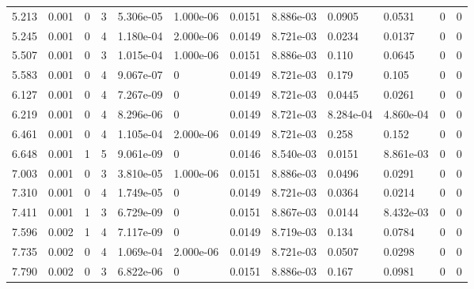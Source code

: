 \documentclass[preview]{standalone}
\begin{document}
{{\begin{tabular}{L{1.2cm}C{1.2cm} C{0.3cm}C{0.5cm} C{1.4cm}C{1.4cm} C{1.4cm}C{1.4cm} C{1.6cm}C{1.6cm} C{1.6cm}C{1.6cm}}
  5.213  &  0.001  & 0     &  3 &  5.306e-05  & 1.000e-06  &  0.0151&   8.886e-03& 0.0905 & 0.0531   &  0 & 0  \\ 
  5.245  &  0.001  & 0     &  4 &  1.180e-04  & 2.000e-06  &  0.0149&   8.721e-03& 0.0234 & 0.0137   &  0 & 0  \\ 
  5.507  &  0.001  & 0     &  3 &  1.015e-04  & 1.000e-06  &  0.0151&   8.886e-03& 0.110 & 0.0645   &  0 & 0  \\ 
  5.583  &  0.001  & 0     &  4 &  9.067e-07  & 0  &  0.0149&   8.721e-03& 0.179 & 0.105   &  0 & 0  \\ 
  6.127  &  0.001  & 0     &  4 &  7.267e-09  & 0  &  0.0149&   8.721e-03& 0.0445 & 0.0261   &  0 & 0  \\ 
  6.219  &  0.001  & 0     &  4 &  8.296e-06  & 0  &  0.0149&   8.721e-03& 8.284e-04 & 4.860e-04   &  0 & 0  \\ 
  6.461  &  0.001  & 0     &  4 &  1.105e-04  & 2.000e-06  &  0.0149&   8.721e-03& 0.258 & 0.152   &  0 & 0  \\ 
  6.648  &  0.001  & 1     &  5 &  9.061e-09  & 0  &  0.0146&   8.540e-03& 0.0151 & 8.861e-03   &  0 & 0  \\ 
  7.003  &  0.001  & 0     &  3 &  3.810e-05  & 1.000e-06  &  0.0151&   8.886e-03& 0.0496 & 0.0291   &  0 & 0  \\ 
  7.310  &  0.001  & 0     &  4 &  1.749e-05  & 0  &  0.0149&   8.721e-03& 0.0364 & 0.0214   &  0 & 0  \\ 
  7.411  &  0.001  & 1     &  3 &  6.729e-09  & 0  &  0.0151&   8.867e-03& 0.0144 & 8.432e-03   &  0 & 0  \\ 
  7.596  &  0.002  & 1     &  4 &  7.117e-09  & 0  &  0.0149&   8.719e-03& 0.134 & 0.0784   &  0 & 0  \\ 
  7.735  &  0.002  & 0     &  4 &  1.069e-04  & 2.000e-06  &  0.0149&   8.721e-03& 0.0507 & 0.0298   &  0 & 0  \\ 
  7.790  &  0.002  & 0     &  3 &  6.822e-06  & 0  &  0.0151&   8.886e-03& 0.167 & 0.0981   &  0 & 0  \\ 
\hline 
\end{tabular} 

}}
\end{document}
